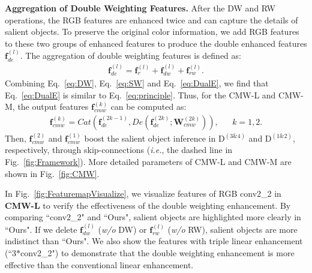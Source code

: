 \documentclass[runningheads]{llncs}
\newcommand{\ie}{\emph{i.e.}}
\begin{document}
\noindent\textbf{Aggregation of Double Weighting Features.}
After the DW and RW operations,
the RGB features are enhanced twice and can capture
the details of salient objects.
To preserve the original color information, we add
RGB features to these two groups of enhanced features to produce
the double enhanced features $\mathbf{f}^{(l)}_{de}$.
The aggregation of double weighting features is defined as:
\begin{equation}
   \begin{aligned}
    \mathbf{f}^{(l)}_{de} = \mathbf{f}^{(l)}_{r} + \mathbf{f}^{(l)}_{dw} + \mathbf{f}^{(l)}_{rw}.
    \label{eq:DualE}
    \end{aligned}
\end{equation}
Combining Eq.~\ref{eq:DW}, Eq.~\ref{eq:SW} and Eq.~\ref{eq:DualE},
we find that Eq.~\ref{eq:DualE} is similar to Eq.~\ref{eq:principle}.
Thus, for the CMW-L and CMW-M, the output
features $\mathbf{f}^{(k)}_{cmw}$ can be computed as:
\begin{equation}
   \begin{aligned}
    \mathbf{f}^{(k)}_{cmw} = Cat( \mathbf{f}^{(2k-1)}_{de},	De(\mathbf{f}^{(2k)}_{de};\mathbf{W}^{(2k)}_{cmw})),  &     &   k=1,2.
    \label{eq:CCW}
    \end{aligned}
\end{equation}
Then, $\mathbf{f}^{(2)}_{cmw}$ and $\mathbf{f}^{(1)}_{cmw}$
boost the salient object inference in D$^{(3\&4)}$ and D$^{(1\&2)}$, respectively,
through skip-connections (\ie, the dashed line in Fig.~\ref{fig:Framework}).
More detailed parameters of CMW-L and CMW-M are shown in Fig.~\ref{fig:CMW}.


In Fig.~\ref{fig:FeaturemapVisualize}, we visualize features of
RGB conv2\_2 in \textbf{CMW-L} to verify the effectiveness of
the double weighting enhancement.
By comparing ``conv2\_2" and ``Ours", salient objects are
highlighted more clearly in ``Ours".
If we delete $\mathbf{f}^{(l)}_{dw}$ (\textit{w/o} DW) or
$\mathbf{f}^{(l)}_{rw}$ (\textit{w/o} RW), salient objects are more indistinct than ``Ours".
We also show the features with triple linear enhancement (``3$\ast$conv2\_2") to
demonstrate that the double weighting enhancement is more effective
than the conventional linear enhancement.
\end{document}
